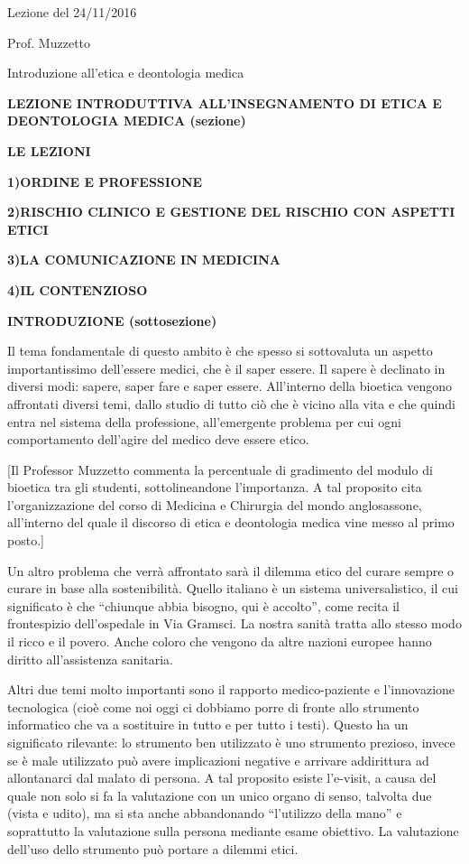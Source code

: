 \documentclass[]{article}
\date{}
\begin{document}
Lezione del 24/11/2016

Prof. Muzzetto

Introduzione all'etica e deontologia medica

\textbf{LEZIONE INTRODUTTIVA ALL'INSEGNAMENTO DI ETICA E DEONTOLOGIA
MEDICA (sezione)}

\textbf{LE LEZIONI}

\textbf{1)ORDINE E PROFESSIONE}

\textbf{2)RISCHIO CLINICO E GESTIONE DEL RISCHIO CON ASPETTI ETICI}

\textbf{3)LA COMUNICAZIONE IN MEDICINA }

\textbf{4)IL CONTENZIOSO}

\textbf{INTRODUZIONE (sottosezione)}

Il tema fondamentale di questo ambito è che spesso si sottovaluta un
aspetto importantissimo dell'essere medici, che è il saper essere. Il
sapere è declinato in diversi modi: sapere, saper fare e saper essere.
All'interno della bioetica vengono affrontati diversi temi, dallo studio
di tutto ciò che è vicino alla vita e che quindi entra nel sistema della
professione, all'emergente problema per cui ogni comportamento
dell'agire del medico deve essere etico.

{[}Il Professor Muzzetto commenta la percentuale di gradimento del
modulo di bioetica tra gli studenti, sottolineandone l'importanza. A tal
proposito cita l'organizzazione del corso di Medicina e Chirurgia del
mondo anglosassone, all'interno del quale il discorso di etica e
deontologia medica vine messo al primo posto.{]}

Un altro problema che verrà affrontato sarà il dilemma etico del curare
sempre o curare in base alla sostenibilità. Quello italiano è un sistema
universalistico, il cui significato è che ``chiunque abbia bisogno, qui
è accolto'', come recita il frontespizio dell'ospedale in Via Gramsci.
La nostra sanità tratta allo stesso modo il ricco e il povero. Anche
coloro che vengono da altre nazioni europee hanno diritto all'assistenza
sanitaria.

Altri due temi molto importanti sono il rapporto medico-paziente e
l'innovazione tecnologica (cioè come noi oggi ci dobbiamo porre di
fronte allo strumento informatico che va a sostituire in tutto e per
tutto i testi). Questo ha un significato rilevante: lo strumento ben
utilizzato è uno strumento prezioso, invece se è male utilizzato può
avere implicazioni negative e arrivare addirittura ad allontanarci dal
malato di persona. A tal proposito esiste l'e-visit, a causa del quale
non solo si fa la valutazione con un unico organo di senso, talvolta due
(vista e udito), ma si sta anche abbandonando ``l'utilizzo della mano''
e soprattutto la valutazione sulla persona mediante esame obiettivo. La
valutazione dell'uso dello strumento può portare a dilemmi etici.
\end{document}
